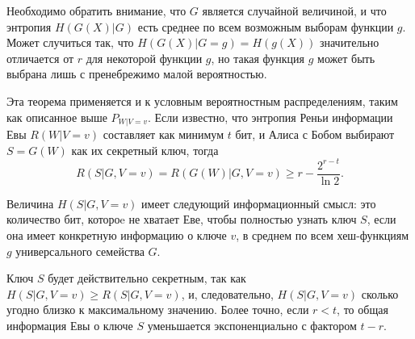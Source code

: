 Необходимо обратить внимание, что $G$ является случайной величиной, и что энтропия $H(G(X)|G)$ есть среднее по всем возможным выборам функции $g$. Может случиться так, что $H(G(X)|G=g) = H(g(X))$ значительно отличается от $r$ для некоторой функции $g$, но такая функция $g$ может быть выбрана лишь с пренебрежимо малой вероятностью.

Эта теорема применяется и к условным вероятностным распределениям, таким как описанное выше $P_{W|V=v}$. Если известно, что энтропия Реньи информации Евы $R(W|V=v)$ составляет как минимум $t$ бит, и Алиса с Бобом выбирают $S = G(W)$ как их секретный ключ, тогда
\begin{equation}
  R(S|G,V=v) = R(G(W)|G,V=v) \geq r - \frac{2^{r - t}}{\ln 2}.
\end{equation}

Величина $H(S|G,V=v)$ имеет следующий информационный смысл: это количество бит, котороe не хватает Еве, чтобы полностью узнать ключ $S$, если она имеет конкретную информацию о ключе $v$, в среднем по всем хеш-функциям $g$ универсального семейства $G$.

Ключ $S$ будет действительно секретным, так как $H(S|G,V=v) \geq R(S|G,V=v)$, и, следовательно, $H(S|G,V=v)$ сколько угодно близко к максимальному значению. Более точно, если $r < t$, то общая информация Евы о ключе $S$ уменьшается экспоненциально с фактором $t-r$.





